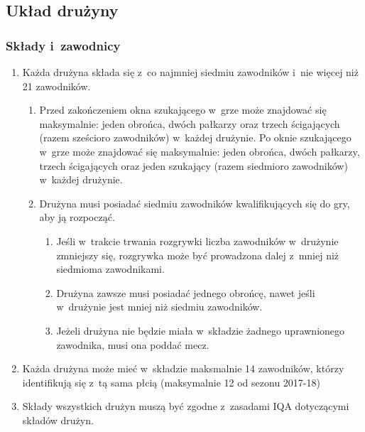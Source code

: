 \documentclass[12pt]{article}
\begin{document}
\subsection{Układ drużyny}

\subsubsection{Składy i~zawodnicy}

\begin{enumerate}
	\item
	      Każda drużyna składa się z~co najmniej siedmiu zawodników i~nie więcej
	      niż 21 zawodników.

	      \begin{enumerate}
		      \item
		            Przed zakończeniem okna szukającego w~grze może znajdować się
		            maksymalnie: jeden obrońca, dwóch pałkarzy oraz trzech ścigających
		            (razem sześcioro zawodników) w~każdej drużynie. Po oknie szukającego
		            w~grze może znajdować się maksymalnie: jeden obrońca, dwóch
		            pałkarzy, trzech ścigających oraz jeden szukający (razem siedmioro
		            zawodników) w~każdej drużynie.
		      \item
		            Drużyna musi posiadać siedmiu zawodników kwalifikujących się do gry,
		            aby ją rozpocząć.

		            \begin{enumerate}
			            \item
			                  Jeśli w~trakcie trwania rozgrywki liczba zawodników w~drużynie
			                  zmniejszy się, rozgrywka może być prowadzona dalej z~mniej niż
			                  siedmioma zawodnikami.
			            \item
			                  Drużyna zawsze musi posiadać jednego obrońcę, nawet jeśli w~drużynie jest mniej niż siedmiu zawodników.
			            \item
			                  Jeżeli drużyna nie będzie miała w~składzie żadnego uprawnionego
			                  zawodnika, musi ona poddać mecz.
		            \end{enumerate}
	      \end{enumerate}
	\item
	      Każda drużyna może mieć w~składzie maksmalnie 14 zawodników, którzy
	      identifikują się z~tą sama płcią (maksymalnie 12 od sezonu 2017-18)
	\item
	      Składy wszystkich drużyn muszą być zgodne z~zasadami IQA dotyczącymi
	      składów drużyn.
\end{enumerate}
\end{document}
